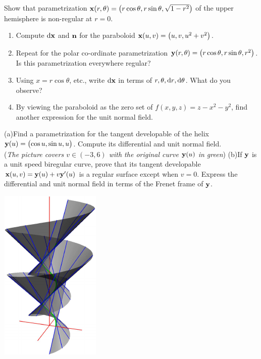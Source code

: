 \begin{exercises}
\exstart Show that parametrization ${\mathbf{x}}(r,\theta)=\bigl(r\cos\theta,r\sin\theta,\sqrt{1-r^2}\bigr)$ of the upper hemisphere is non-regular at $r=0$.

\begin{enumerate}\setcounter{enumi}{1}
  \item\label{exs:paraboloid}\begin{enumerate}
    \item Compute $\mathrm{d}{\mathbf{x}}$ and ${\mathbf{n}}$ for the paraboloid ${\mathbf{x}}(u,v)=\bigl(u,v,u^2+v^2\bigr)$.
  	\item Repeat for the polar co-ordinate parametrization ${\mathbf{y}}(r,\theta)=\bigl(r\cos\theta,r\sin\theta,r^2\bigr)$. Is this parametrization everywhere regular?
		\item Using $x=r\cos\theta$, etc., write $\mathrm{d}{\mathbf{x}}$ in terms of $r,\theta,{\mathrm{d} r},{\mathrm{d}\theta}$. What do you observe?
		\item By viewing the paraboloid as the zero set of $f(x,y,z)=z-x^2-y^2$, find another expression for the unit normal field.
	\end{enumerate}

  \begin{minipage}[t]{0.75\linewidth}\vspace{0pt}
	\item\label{exs:tandev}\lstsp(a)\lstsp\hangindent\leftmarginii Find a parametrization for the tangent developable of the helix ${\mathbf{y}}(u)=\bigl(\cos u,\sin u,u\bigr)$. Compute its differential and unit normal field.\\
    (\emph{The picture covers $v\in(-3,6)$ with the original curve ${\mathbf{y}}(u)$ in green})\smallbreak
    \lstsp(b)\lstsp\hangindent\leftmarginii If ${\mathbf{y}}$ is a unit speed biregular curve, prove that its tangent developable ${\mathbf{x}}(u,v)={\mathbf{y}}(u)+v{\mathbf{y}}'(u)$ is a regular surface except when $v=0$. Express the differential and unit normal field in terms of the Frenet frame of ${\mathbf{y}}$.
    
  \end{minipage}\hfill\begin{minipage}[t]{0.24\linewidth}\vspace{-10pt}
  \flushright\href{http://www.math.uci.edu/~ndonalds/math162a/surfaces-tandev.html}{\includegraphics{surfaces-tandev}}
  \end{minipage}
  

\end{enumerate}
\end{exercises}
